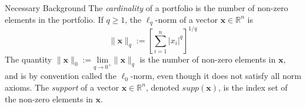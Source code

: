 \begin{section}{Necessary Background}
The \textit{cardinality} of a portfolio is the number of non-zero elements in the portfolio. If $q\geq 1$, the $\ell_{q}$-norm of a vector $\mathbf{x}\in \mathbb{R}^{n}$ is $$\lVert
\mathbf{x}
\rVert_{q}:=\left[
\sum\limits_{i=1}^{n}\lvert
x_{i}
\rvert^{q}
\right]^{1/q}$$
The quantity $\lVert
\mathbf{x}
\rVert_{0}:=\underset{q\rightarrow 0^{+}}{\text{lim}}\lVert
\mathbf{x}
\rVert_{q}$ is the number of non-zero elements in $\mathbf{x}$, and is by convention called the $\ell_{0}$-norm, even though it does not satisfy all norm axioms. The \textit{support} of a vector $\mathbf{x} \in \mathbb{R}^{n}$, denoted $supp(\mathbf{x})$, is the index set of the non-zero elements in $\mathbf{x}$. 
\end{section}